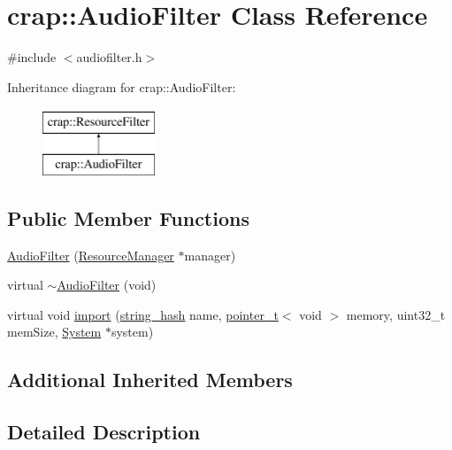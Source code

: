 \hypertarget{classcrap_1_1_audio_filter}{}\section{crap\+:\+:Audio\+Filter Class Reference}
\label{classcrap_1_1_audio_filter}


{\ttfamily \#include $<$audiofilter.\+h$>$}

Inheritance diagram for crap\+:\+:Audio\+Filter\+:\begin{figure}[H]
\begin{center}
\leavevmode
\includegraphics[height=2.000000cm]{classcrap_1_1_audio_filter}
\end{center}
\end{figure}
\subsection*{Public Member Functions}
\begin{DoxyCompactItemize}
\item 
\hyperlink{classcrap_1_1_audio_filter_a3b4ceaf9e848f466d32d6f0e5b548321}{Audio\+Filter} (\hyperlink{classcrap_1_1_resource_manager}{Resource\+Manager} $\ast$manager)
\item 
virtual \hyperlink{classcrap_1_1_audio_filter_abd5304e0b155921dedc2b53ddb68f23d}{$\sim$\+Audio\+Filter} (void)
\item 
virtual void \hyperlink{classcrap_1_1_audio_filter_ac3895c47bf2d6ac8f15237fe7a72807b}{import} (\hyperlink{classcrap_1_1string__hash}{string\+\_\+hash} name, \hyperlink{structcrap_1_1pointer__t}{pointer\+\_\+t}$<$ void $>$ memory, uint32\+\_\+t mem\+Size, \hyperlink{classcrap_1_1_system}{System} $\ast$system)
\end{DoxyCompactItemize}
\subsection*{Additional Inherited Members}


\subsection{Detailed Description}


